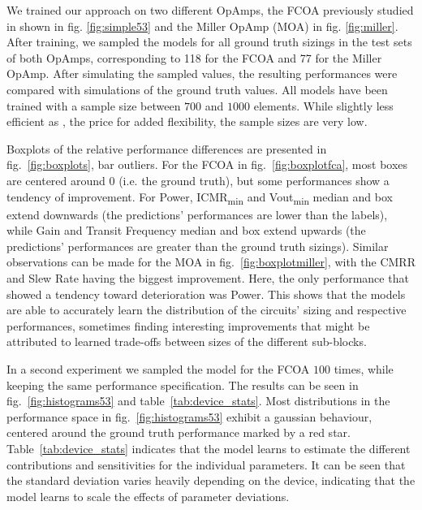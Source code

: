 \documentclass[conference]{IEEEtran}
\begin{document}
	We trained our approach on two different OpAmps, the FCOA previously studied in \cite{leibl24inverse} shown in fig. \ref{fig:simple53} and the Miller OpAmp (MOA) in fig. \ref{fig:miller}. After training, we sampled the models for all ground truth sizings in the test sets of both OpAmps, corresponding to 118 for the FCOA and 77 for the Miller OpAmp. After simulating the sampled values, the resulting performances were compared with simulations of the ground truth values. 
	All models have been trained with a sample size between $700$ and $1000$ elements. While slightly less efficient as \cite{leibl24inverse}, the price for added flexibility, the sample sizes are very low.
	
	Boxplots of the relative performance differences are presented in fig.~\ref{fig:boxplots}, bar outliers.
	For the FCOA in fig.~\ref{fig:boxplotfca}, most boxes are centered around 0 (i.e. the ground truth), but some performances show a tendency of improvement. For Power, ICMR\textsubscript{min} and Vout\textsubscript{min} median and box extend downwards (the predictions' performances are lower than the labels), while Gain and Transit Frequency median and box extend upwards (the predictions' performances are greater than the ground truth sizings). Similar observations can be made for the MOA in fig.~\ref{fig:boxplotmiller}, with the CMRR and Slew Rate having the biggest improvement. Here, the only performance that showed a tendency toward deterioration was Power. This shows that the models are able to accurately learn the distribution of the circuits' sizing and respective performances, sometimes finding interesting improvements that might be attributed to learned trade-offs between sizes of the different sub-blocks.
	
	In a second experiment we sampled the model for the FCOA $100$ times, while keeping the same performance specification. The results can be seen in fig.~\ref{fig:histograms53} and table~\ref{tab:device_stats}. Most distributions in the performance space in fig.~\ref{fig:histograms53} exhibit a gaussian behaviour, centered around the ground truth performance marked by a red star. Table~\ref{tab:device_stats} indicates that the model learns to estimate the different contributions and sensitivities for the individual parameters. It can be seen that the standard deviation varies heavily depending on the device, indicating that the model learns to scale the effects of parameter deviations.
\end{document}
